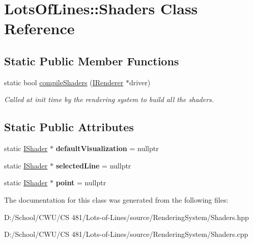 \hypertarget{class_lots_of_lines_1_1_shaders}{}\section{Lots\+Of\+Lines\+:\+:Shaders Class Reference}
\label{class_lots_of_lines_1_1_shaders}
\subsection*{Static Public Member Functions}
\begin{DoxyCompactItemize}
\item 
static bool \hyperlink{class_lots_of_lines_1_1_shaders_a5ffa7ad5a5a2c4b2ce2663ee7674a25d}{compile\+Shaders} (\hyperlink{class_lots_of_lines_1_1_i_renderer}{I\+Renderer} $\ast$driver)\hypertarget{class_lots_of_lines_1_1_shaders_a5ffa7ad5a5a2c4b2ce2663ee7674a25d}{}\label{class_lots_of_lines_1_1_shaders_a5ffa7ad5a5a2c4b2ce2663ee7674a25d}

\begin{DoxyCompactList}\small\item\em Called at init time by the rendering system to build all the shaders. \end{DoxyCompactList}\end{DoxyCompactItemize}
\subsection*{Static Public Attributes}
\begin{DoxyCompactItemize}
\item 
static \hyperlink{class_lots_of_lines_1_1_i_shader}{I\+Shader} $\ast$ {\bfseries default\+Visualization} = nullptr\hypertarget{class_lots_of_lines_1_1_shaders_a5e359542438b14bdd06b4b1142230904}{}\label{class_lots_of_lines_1_1_shaders_a5e359542438b14bdd06b4b1142230904}

\item 
static \hyperlink{class_lots_of_lines_1_1_i_shader}{I\+Shader} $\ast$ {\bfseries selected\+Line} = nullptr\hypertarget{class_lots_of_lines_1_1_shaders_aa1e50aa59e6e9ae514da820215b9fe9b}{}\label{class_lots_of_lines_1_1_shaders_aa1e50aa59e6e9ae514da820215b9fe9b}

\item 
static \hyperlink{class_lots_of_lines_1_1_i_shader}{I\+Shader} $\ast$ {\bfseries point} = nullptr\hypertarget{class_lots_of_lines_1_1_shaders_a0d9ac30bf5240c351d422dd32db80eae}{}\label{class_lots_of_lines_1_1_shaders_a0d9ac30bf5240c351d422dd32db80eae}

\end{DoxyCompactItemize}


The documentation for this class was generated from the following files\+:\begin{DoxyCompactItemize}
\item 
D\+:/\+School/\+C\+W\+U/\+C\+S 481/\+Lots-\/of-\/\+Lines/source/\+Rendering\+System/Shaders.\+hpp\item 
D\+:/\+School/\+C\+W\+U/\+C\+S 481/\+Lots-\/of-\/\+Lines/source/\+Rendering\+System/Shaders.\+cpp\end{DoxyCompactItemize}
